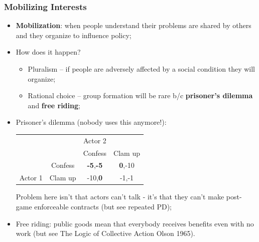 \documentclass[aspectratio=169]{beamer}
\theoremstyle{principle}
\begin{document}
\begin{frame}
\frametitle{Mobilizing Interests}
\begin{itemize}
\item \textbf{Mobilization}: when people understand their problems are shared by others and they organize to influence policy;
\item How does it happen?
\begin{itemize}
\item Pluralism -- if people are adversely affected by a social condition they will organize;
\item Rational choice -- group formation will be rare b/c \textbf{prisoner's dilemma} and \textbf{free riding};
\end{itemize}
\item Prisoner's dilemma (nobody uses this anymore!):
\begin{table}[]
\begin{tabular}{cccc}
 &  & Actor 2 & \\
 &&Confess& Clam up\\
  & Confess & \textbf{-5},\textbf{-5} & \textbf{0},-10\\
Actor 1 & Clam up & -10,\textbf{0}&-1,-1
\end{tabular}
\end{table}
Problem here isn't that actors can't talk - it's that they can't make post-game enforceable contracts (but see repeated PD);
\item Free riding: public goods mean that everybody receives benefits even with no work (but see The Logic of Collective Action Olson 1965).
\end{itemize}
\end{frame}
\end{document}

